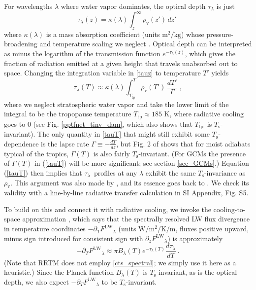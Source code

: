 \documentclass[9pt,twocolumn,twoside,lineno]{pnas-new}
\newcommand{\beqn}{\begin{equation}}
\newcommand{\eeqn}{\end{equation}}
\newcommand{\eqnref}[1]{(\ref{#1})}
\newcommand{\der}[2]{\ensuremath{\frac{d #1}{d #2}}}
\newcommand{\ppz}{\ensuremath{\partial_z}}
\newcommand{\ppt}{\ensuremath{\partial_T}}
\newcommand{\FLW}{\ensuremath{F^\mathrm{LW}}}
\newcommand{\tauk}{\ensuremath{\tau_\lambda}}
\newcommand{\Wmsq}{\ensuremath{\mathrm{W/m^2}}}
\newcommand{\meter}{\ensuremath{\mathrm{m}}}
\newcommand{\rhov}{\ensuremath{\rho_\mathrm{v}}}
\newcommand{\Ts}{\ensuremath{T_\mathrm{s}}}
\newcommand{\Ttp}{\ensuremath{T_\mathrm{tp}}}
\begin{document}
	For wavelengths  $\lambda$ where water vapor dominates, the optical depth $\tauk$ is just
	\beqn
		\tauk(z) = \kappa(\lambda) \int_z^\infty   \rhov(z') \, dz'  \; 
		\label{tauz}
	\eeqn
		where $\kappa(\lambda)$ is a  mass absorption coefficient  (units $\mathrm{m^2/kg}$) whose pressure-broadening and temperature scaling we neglect \citep[as in ref.][see  also SI text 2]{ingram2010}. Optical depth can be interpreted as minus the logarithm of the transmission function $e^{-\tauk(z)}$, which gives the fraction of radiation emitted at a given height that travels unabsorbed out to space. Changing the integration variable in \eqref{tauz} to temperature $T'$  yields
		\beqn
		\tauk(T) \approx  \kappa(\lambda) \int_{\Ttp}^T   \rhov(T') \, \frac{dT'}{\Gamma}  \; ,
		\label{tauT}
	\eeqn
	where we neglect stratospheric water vapor and take the lower limit of the integral to be the tropopause temperature $\Ttp \approx 185$ K, where radiative cooling goes to 0 (see Fig. \ref{pptfnet_tinv_dam}, which also shows that \Ttp\ is \Ts-invariant). The only quantity in \eqref{tauT} that might still exhibit some \Ts-dependence is the lapse rate $\Gamma\equiv -\frac{dT}{dz}$, but Fig. 2 of \cite{ingram2010} shows that  for moist adiabats typical of the tropics, $\Gamma(T)$ is also fairly  \Ts-invariant. (For GCMs the presence of $\Gamma(T)$ in \eqnref{tauT} will be more significant; see section \ref{sec_GCMs}.) Equation \eqnref{tauT} then implies that \tauk\ profiles at any $\lambda$ exhibit the same \Ts-invariance as \rhov. This argument was also made by \cite{ingram2010}, and its essence goes back to  \cite{simpson1928}. We check its validity with a line-by-line radiative transfer calculation in SI Appendix, Fig. S5.
	
	To build on this and connect it with radiative cooling, we invoke the cooling-to-space  approximation \cite[][]{thomas2002, rodgers1966}, which says that the spectrally resolved LW flux divergence in temperature coordinates $-\ppt \FLW_\lambda$ (units $\Wmsq/\mathrm{K}/\meter$, fluxes positive upward, minus sign introduced for consistent sign with  $\ppz \FLW_\lambda$) is approximately
	\beqn
		-\ppt \FLW_\lambda \approx  \pi B_\lambda(T) e^{-\tauk(T)} \der{\tauk}{T} \ .
	\label{cts_spectral}
	\eeqn
 (Note that RRTM does not employ \eqref{cts_spectral}; we simply use it here as a heuristic.) Since the Planck function $B_\lambda(T)$ is \Ts-invariant, as is the optical depth, we also expect $-\ppt \FLW_\lambda$ to be \Ts-invariant. 
\end{document}

